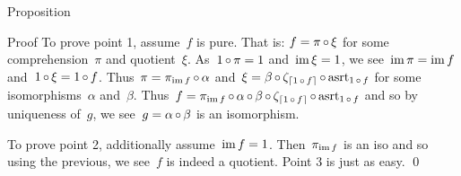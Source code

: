 \documentclass[b]{subfiles}
\begin{document}
\begin{parsec}
\begin{point}{Proposition}
\begin{point}{Proof}
To prove point 1, assume~$f$ is pure.
That is: $f = \pi \mathop{\circ} \xi$ for some comprehension~$\pi$
        and quotient~$\xi$.
As~$1 \mathop{\circ} \pi=1$ and~$\operatorname{im} \xi = 1$,
    we see~$\operatorname{im} \pi = \operatorname{im} f$ and~$1 \mathop{\circ} \xi = 1\mathop{\circ} f$.
Thus~$\pi = \pi_{\operatorname{im} f} \mathop{\circ} \alpha$
    and~$\xi = \beta \mathop{\circ} \zeta_{\left\lceil1 \mathop{\circ} f\right\rceil}
                \mathop{\circ} \mathrm{asrt}_{1 \mathop{\circ} f}$
        for some isomorphisms~$\alpha$ and~$\beta$.
Thus~$f = \pi_{\operatorname{im} f} \mathop{\circ} \alpha \mathop{\circ} \beta
                \mathop{\circ} \zeta_{\left\lceil1 \mathop{\circ} f\right\rceil}
                \mathop{\circ} \mathrm{asrt}_{1 \mathop{\circ} f}$
        and so by uniqueness of~$g$,
        we see~$g = \alpha \mathop{\circ} \beta$ is an isomorphism.

To prove point 2, additionally assume~$\operatorname{im} f= 1$.
Then~$\pi_{\operatorname{im} f}$ is an iso and so
using the previous, we see~$f$ is indeed a quotient.
Point 3 is just as easy. \qed
\end{point}
\end{point}
\end{parsec}
\end{document}
